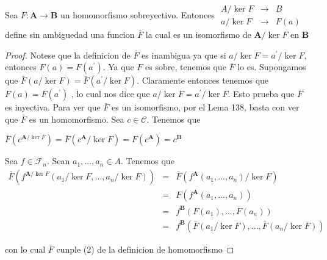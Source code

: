   \begin{theorem}
    Sea \(F:\mathbf{A}\rightarrow \mathbf{B}\) un homomorfismo sobreyectivo. Entonces
    \(\displaystyle \begin{array}{lll} A/\ker F & \rightarrow & B \\ a/\ker F & \rightarrow & F(a) \end{array} \)
    define sin ambiguedad una funcion \(\bar{F}\) la cual es un isomorfismo de \( \mathbf{A}/\ker F\) en \(\mathbf{B}\)
  \end{theorem}
  \begin{proof}
    Notese que la definicion de \(\bar{F}\) es inambigua ya que si \(a/\ker F=a^{\prime }/\ker F\), entonces \(F(a)=F(a^{\prime }).\) Ya que \(F\) es sobre, tenemos que \(\bar{F}\) lo es. Supongamos que \(\bar{F}(a/\ker F)=\bar{F} (a^{\prime }/\ker F).\) Claramente entonces tenemos que \(F(a)=F(a^{\prime })\) , lo cual nos dice que \(a/\ker F=a^{\prime }/\ker F\). Esto prueba que \(\bar{F }\) es inyectiva. Para ver que \(\bar{F}\) es un isomorfismo, por el Lema 138, basta con ver que \(\bar{F}\) es un homomorfismo. Sea \(c\in \mathcal{C}\). Tenemos que

    \(\displaystyle \bar{F}(c^{\mathbf{A}/\ker F})=\bar{F}(c^{\mathbf{A}}/\ker F)=F(c^{\mathbf{A} })=c^{\mathbf{B}} \)

    Sea \(f\in \mathcal{F}_{n}\). Sean \(a_{1},...,a_{n}\in A\). Tenemos que
    \(\displaystyle \begin{array}{ccl} \bar{F}(f^{\mathbf{A}/\ker F}(a_{1}/\ker F,...,a_{n}/\ker F)) & = & \bar{F} (f^{\mathbf{A}}(a_{1},...,a_{n})/\ker F) \\ & = & F(f^{\mathbf{A}}(a_{1},...,a_{n})) \\ & = & f^{\mathbf{B}}(F(a_{1}),...,F(a_{n})) \\ & = & f^{\mathbf{B}}(\bar{F}(a_{1}/\ker F),...,\bar{F}(a_{n}/\ker F)) \end{array} \)

    con lo cual \(\bar{F}\) cunple (2) de la definicion de homomorfismo
  \end{proof}

